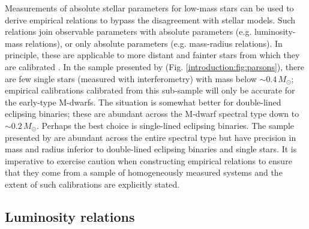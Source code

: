 Measurements of absolute stellar parameters for low-mass stars can be used to derive empirical relations to bypass the disagreement with stellar models. Such relations join observable parameters with absolute parameters (e.g. luminosity-mass relations), or only absolute parameters (e.g. mass-radius relations). In principle, these are applicable to more distant and fainter stars from which they are calibrated \citep{2013AJ....145...52M}. In the sample presented by \citet{2010MNRAS.402.2591P} (Fig. \ref{introduction:fig:parsons}), there are few single stars (measured with interferometry) with mass below $\sim 0.4\,M_\odot$; empirical calibrations calibrated from this sub-sample will only be accurate for the early-type M-dwarfs. The situation is somewhat better for double-lined eclipsing binaries; these are abundant across the M-dwarf spectral type down to $\sim 0.2\,M_\odot$. Perhaps the best choice is single-lined eclipsing binaries. The sample presented by \citet{2010MNRAS.402.2591P} are abundant across the entire spectral type but have precision in mass and radius inferior to double-lined eclipsing binaries and single stars. It is imperative to  exercise caution when constructing empirical relations to ensure that they come from a sample of homogeneously measured systems and the extent of such calibrations are explicitly stated.  






\subsection{Luminosity relations}\label{introduction:luminosity_relations}


